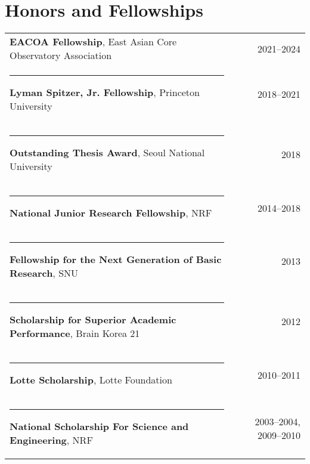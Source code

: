 \documentclass[11pt,letterpaper,roman]{moderncv}        %
\begin{document}
\section{Honors and Fellowships}
\begin{tabular*}{\textwidth}{l@{\extracolsep{\fill}}r}
  {{\bfseries EACOA Fellowship}, East Asian Core Observatory Association} & {2021--2024} \\
  \rule[-1.2ex]{-2.5pt}{4ex}
  {{\bfseries Lyman Spitzer, Jr. Fellowship}, Princeton University} & {2018--2021} \\
  \rule[-1.2ex]{-2.5pt}{4ex}
  {{\bfseries Outstanding Thesis Award}, Seoul National University} & {2018} \\
  \rule[-1.2ex]{-2.5pt}{4ex}
  {{\bfseries National Junior Research Fellowship}, NRF} & {2014--2018} \\
  \rule[-1.2ex]{-2.5pt}{4ex}
  {{\bfseries Fellowship for the Next Generation of Basic Research}, SNU} & {2013} \\
  \rule[-1.2ex]{-2.5pt}{4ex}
  {{\bfseries Scholarship for Superior Academic Performance}, Brain Korea 21} & {2012} \\
  \rule[-1.2ex]{-2.5pt}{4ex}
  {{\bfseries Lotte Scholarship}, Lotte Foundation} & {2010--2011} \\
  \rule[-1.2ex]{-2.5pt}{4ex}
  {{\bfseries National Scholarship For Science and Engineering}, NRF} & {2003--2004, 2009--2010}
\end{tabular*}%







\end{document}
